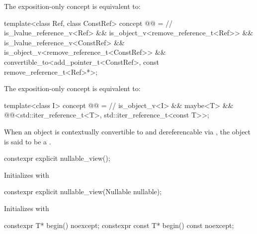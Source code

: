 \pnum
The exposition-only  concept is equivalent to:
\begin{itemdecl}
  template<class Ref, class ConstRef>
  concept @@ =               // \expos
  is_lvalue_reference_v<Ref> &&
  is_object_v<remove_reference_t<Ref>> &&
  is_lvalue_reference_v<ConstRef> &&
  is_object_v<remove_reference_t<ConstRef>> &&
  convertible_to<add_pointer_t<ConstRef>, const remove_reference_t<Ref>*>;

\end{itemdecl}


\pnum
The exposition-only  concept is equivalent to:
\begin{itemdecl}
  template<class I>
  concept @@ =               // \expos
  is_object_v<I> &&
  maybe<T> &&
  @@<std::iter_reference_t<T>,
                      std::iter_reference_t<const T>>;
\end{itemdecl}

\begin{itemdescr}
\pnum
When an object is contextually convertible to  and dereferencable via , the object is said to be a .
\end{itemdescr}

%

\pnum
\begin{itemdecl}
constexpr explicit nullable_view();
\end{itemdecl}
\begin{itemdescr}
\pnum{}
\effects{}
Initializes  with 
\end{itemdescr}

\begin{itemdecl}
constexpr explicit nullable_view(Nullable nullable);
\end{itemdecl}
\begin{itemdescr}
\pnum{}
\effects{}
Initializes  with 
\end{itemdescr}

\begin{itemdecl}
constexpr T* begin() noexcept;
constexpr const T* begin() const noexcept;
\end{itemdecl}

\begin{itemdescr}
\pnum
\returns
{}
\end{itemdescr}

